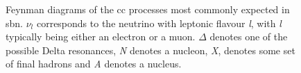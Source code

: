 \begin{figure}[h!]
\begin{subfigure}{0.3\linewidth}
{\begin{feynman}
\end{feynman}
}
\end{subfigure}
\caption[Feynman diagrams of the \gls{cc} processes most commonly expected in \gls{sbn}.]{Feynman diagrams of the \gls{cc} processes most commonly expected in \gls{sbn}. $\nu_l$ corresponds to the neutrino with leptonic flavour \textit{l}, with \textit{l} typically being either an electron or a muon. $\Delta$ denotes one of the possible Delta resonances, \textit{N} denotes a nucleon, \textit{X}, denotes some set of final hadrons and \textit{A} denotes a nucleus.}
\label{fig:CC_Feynman_diagrams}
\end{figure}

